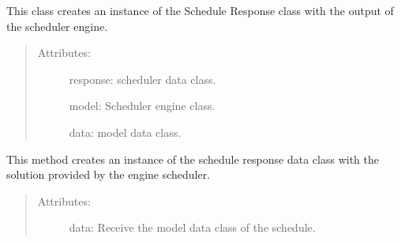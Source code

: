 \documentclass[letterpaper,10pt,english]{sphinxmanual}
\begin{document}
\begin{fulllineitems}
\label{\detokenize{index:src.scheduler_response_factory.SchedulerResponseFactory}}
\sphinxAtStartPar
{}

\sphinxAtStartPar
This class creates an instance of the Schedule Response class with the output of the scheduler engine.
\begin{quote}
\begin{description}
\item[{Attributes:}] \leavevmode
\sphinxAtStartPar
response:                     scheduler data class.

\sphinxAtStartPar
model:                        Scheduler engine class.

\sphinxAtStartPar
data:                         model data class.

\end{description}
\end{quote}

\begin{fulllineitems}
\label{\detokenize{index:src.scheduler_response_factory.SchedulerResponseFactory.create}}
\sphinxAtStartPar
{}

\sphinxAtStartPar
This method creates an instance of the schedule response data class with the solution provided by the engine
scheduler.
\begin{quote}
\begin{description}
\item[{Attributes:}] \leavevmode
\sphinxAtStartPar
data:                 Receive the model data class of the schedule.

\end{description}
\end{quote}

\end{fulllineitems}


\end{fulllineitems}
\end{document}
